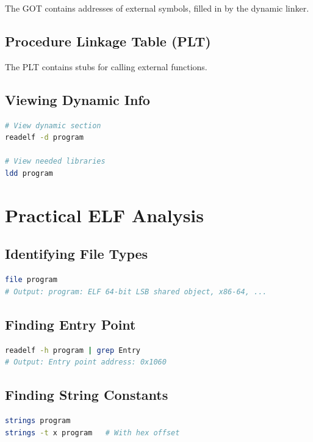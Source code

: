 The GOT contains addresses of external symbols, filled in by the dynamic linker.

\subsection{Procedure Linkage Table (PLT)}

The PLT contains stubs for calling external functions.

\subsection{Viewing Dynamic Info}

\begin{lstlisting}[language=bash]
# View dynamic section
readelf -d program

# View needed libraries
ldd program
\end{lstlisting}

\section{Practical ELF Analysis}

\subsection{Identifying File Types}

\begin{lstlisting}[language=bash]
file program
# Output: program: ELF 64-bit LSB shared object, x86-64, ...
\end{lstlisting}

\subsection{Finding Entry Point}

\begin{lstlisting}[language=bash]
readelf -h program | grep Entry
# Output: Entry point address: 0x1060
\end{lstlisting}

\subsection{Finding String Constants}

\begin{lstlisting}[language=bash]
strings program
strings -t x program   # With hex offset
\end{lstlisting}

